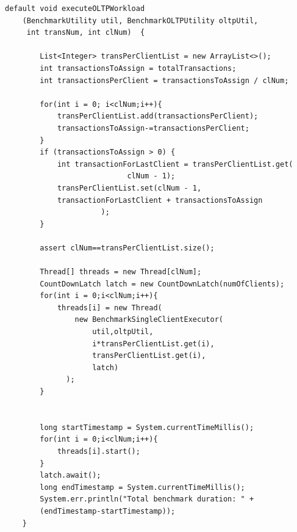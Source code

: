 \documentclass[12pt,oneside]{memoir}
\begin{document}

\begin{lstlisting}[title={OLTPBenchmarkExecutor.java},captionpos=t]
default void executeOLTPWorkload
    (BenchmarkUtility util, BenchmarkOLTPUtility oltpUtil, 
     int transNum, int clNum)  {

        List<Integer> transPerClientList = new ArrayList<>();
        int transactionsToAssign = totalTransactions;
        int transactionsPerClient = transactionsToAssign / clNum;

        for(int i = 0; i<clNum;i++){
            transPerClientList.add(transactionsPerClient);
            transactionsToAssign-=transactionsPerClient;
        }
        if (transactionsToAssign > 0) {
            int transactionForLastClient = transPerClientList.get(
							clNum - 1);
            transPerClientList.set(clNum - 1, 
			transactionForLastClient + transactionsToAssign
					  );
        }

        assert clNum==transPerClientList.size();

        Thread[] threads = new Thread[clNum];
        CountDownLatch latch = new CountDownLatch(numOfClients);
        for(int i = 0;i<clNum;i++){
            threads[i] = new Thread(
				new BenchmarkSingleClientExecutor(
					util,oltpUtil,
					i*transPerClientList.get(i),
					transPerClientList.get(i),
					latch)
			  );
        }


        long startTimestamp = System.currentTimeMillis();
        for(int i = 0;i<clNum;i++){
            threads[i].start();
        }
        latch.await();
        long endTimestamp = System.currentTimeMillis();
        System.err.println("Total benchmark duration: " + 
		(endTimestamp-startTimestamp));
    }
\end{lstlisting}

\end{document}
